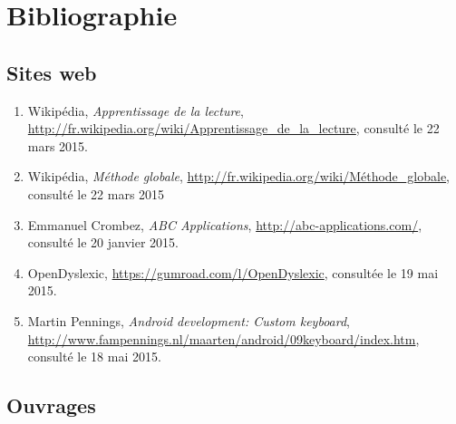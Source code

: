 \section{Bibliographie}

\subsection*{Sites web}
\begin{enumerate}
\item Wikipédia, \textit{Apprentissage de la lecture}, \url{http://fr.wikipedia.org/wiki/Apprentissage_de_la_lecture}, consulté le 22 mars 2015.
\item Wikipédia, \textit{Méthode globale}, \url{http://fr.wikipedia.org/wiki/Méthode_globale}, consulté le 22 mars 2015
\item Emmanuel Crombez, \textit{ABC Applications}, \url{http://abc-applications.com/}, consulté le 20 janvier 2015.
\item OpenDyslexic, \url{https://gumroad.com/l/OpenDyslexic}, consultée le 19 mai 2015.
\item Martin Pennings, \textit{Android development: Custom keyboard}, \url{http://www.fampennings.nl/maarten/android/09keyboard/index.htm}, consulté le 18 mai 2015.
\end{enumerate}

\subsection*{Ouvrages}